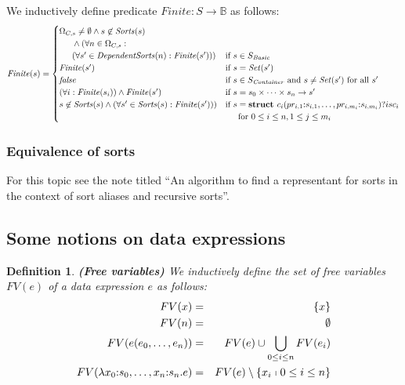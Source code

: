 \documentclass[a4paper,11pt]{article}
\newcommand{\Bools}{{\mathbb B}}   %
\newcommand{\f}[1]{{\mathit{#1}}}
\newcommand{\Set}{{\mathit{Set}}}
\newcommand{\basicsort}{{S_{\mathit{Basic}}}}
\newcommand{\containersort}{{S_{\mathit{Container}}}}
\newtheorem{thdefinition}{Definition}[section]
\newenvironment{definition}
  {\begin{thdefinition}\em}
  {\end{thdefinition}}
\begin{document}
We inductively define predicate $\f{Finite}: S \rightarrow \Bools$ as follows:
\begin{equation*}
 \f{Finite}(s) = \begin{cases}
              \Omega_{C,s} \neq \emptyset \land s \not \in \f{Sorts}(s) & \\\indent \land (\forall n \in \Omega_{C,s}:\\\indent (\forall s' \in \f{DependentSorts}(n): \f{Finite}(s'))) & \text{if $s \in \basicsort$}\\
              \f{Finite}(s') & \text{if $s = \Set(s')$} \\
              \f{false} & \text{if $s \in \containersort$ and $s \neq \Set(s')$ for all $s'$}\\
              (\forall i: \f{Finite}(s_i)) \land \f{Finite}(s') & \text{if $s = s_0 \times \dots \times s_n \rightarrow s'$}\\
              s \not \in \f{Sorts}(s) \land (\forall s' \in \f{Sorts}(s): \f{Finite}(s'))) & \text{if $s = \textbf{struct } c_i(pr_{i,1}{:}s_{i,1}, \dots, pr_{i,m_i}{:}s_{i,m_i})?isc_i$}\\&\text{\indent for $0 \leq i \leq n, 1 \leq j \leq m_i$}
             \end{cases}
\end{equation*}

\subsubsection{Equivalence of sorts}
For this topic see the note titled ``An algorithm to find a representant for sorts in the context of sort aliases and recursive sorts''.

\subsection{Some notions on data expressions}
\begin{definition}\textbf{(Free variables)}
We inductively define the set of free variables $FV(e)$ of a data expression $e$ as follows:
\begin{eqnarray*}
FV(x) & = & \{ x \}\\
FV(n) & = & \emptyset\\
FV(e(e_0, \dots, e_n)) & = & FV(e) \cup \bigcup_{0 \leq i \leq n} FV(e_i)\\
FV(\lambda x_0{:}s_0, \dots, x_n{:}s_n . e) & = & FV(e) \setminus \{ x_i \shortmid 0 \leq i \leq n \}
\end{eqnarray*}
\end{definition}
\end{document}
